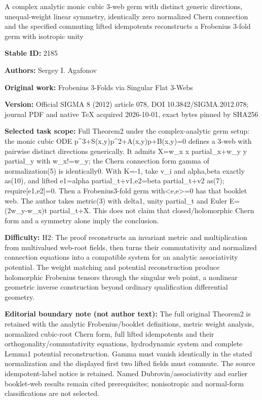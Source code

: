 \documentclass[11pt]{article}
\begin{document}
\begin{center}\Large A complex analytic monic cubic 3-web germ with distinct generic directions, unequal-weight linear symmetry, identically zero normalized Chern connection and the specified commuting lifted idempotents reconstructs a Frobenius 3-fold germ with isotropic unity\end{center}
\noindent\textbf{Stable ID:} 2185\par
\noindent\textbf{Authors:} Sergey I. Agafonov\par
\noindent\textbf{Original work:} Frobenius 3-Folds via Singular Flat 3-Webs\par
\noindent\textbf{Version:} Official SIGMA 8 (2012) article 078, DOI 10.3842/SIGMA.2012.078; journal PDF and native TeX acquired 2026-10-01, exact bytes pinned by SHA256\par
\noindent\textbf{Selected task scope:} Full Theorem2 under the complex-analytic germ setup: the monic cubic ODE p\textasciicircum{}3+\allowbreak{}S(x,y)p\textasciicircum{}2+\allowbreak{}A(x,y)p+\allowbreak{}B(x,y)=\allowbreak{}0 defines a 3-web with pairwise distinct directions generically. It admits X=\allowbreak{}w\_x x partial\_x+\allowbreak{}w\_y y partial\_y with w\_x!=\allowbreak{}w\_y; the Chern connection form gamma of normalization(5) is identically0. With K=\allowbreak{}-1, take v\_i and alpha,beta exactly as(10), and lifted e1=\allowbreak{}alpha partial\_t+\allowbreak{}v1,e2=\allowbreak{}beta partial\_t+\allowbreak{}v2 as(7); require[e1,e2]=\allowbreak{}0. Then a Frobenius3-fold germ with<e,e>=\allowbreak{}0 has that booklet web. The author takes metric(3) with delta1, unity partial\_t and Euler E=\allowbreak{}(2w\_y-w\_x)t partial\_t+\allowbreak{}X. This does not claim that closed/holomorphic Chern form and a symmetry alone imply the conclusion.\par
\noindent\textbf{Difficulty:} H2: The proof reconstructs an invariant metric and multiplication from multivalued web-root fields, then turns their commutativity and normalized connection equations into a compatible system for an analytic associativity potential. The weight matching and potential reconstruction produce holomorphic Frobenius tensors through the singular web point, a nonlinear geometric inverse construction beyond ordinary qualification differential geometry.\par
\noindent\textbf{Editorial boundary note (not author text):} The full original Theorem2 is retained with the analytic Frobenius/booklet definitions, metric weight analysis, normalized cubic-root Chern form, full lifted idempotents and their orthogonality/commutativity equations, hydrodynamic system and complete Lemma1 potential reconstruction. Gamma must vanish identically in the stated normalization and the displayed first two lifted fields must commute. The source idempotent-label notice is retained. Named Dubrovin/associativity and earlier booklet-web results remain cited prerequisites; nonisotropic and normal-form classifications are not selected.\par
\end{document}
